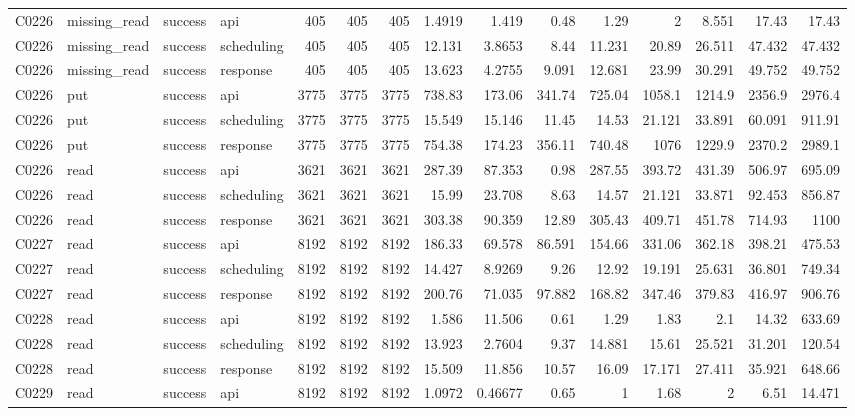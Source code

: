 \begin{landscape}
\begin{longtable}{llllrrrrrrrrrrr}
C0226 & missing\_\allowbreak{}read & success & api & 405 & 405 & 405 & 1.4919 & 1.419 & 0.48 & 1.29 & 2 & 8.551 & 17.43 & 17.43\\
C0226 & missing\_\allowbreak{}read & success & scheduling & 405 & 405 & 405 & 12.131 & 3.8653 & 8.44 & 11.231 & 20.89 & 26.511 & 47.432 & 47.432\\
C0226 & missing\_\allowbreak{}read & success & response & 405 & 405 & 405 & 13.623 & 4.2755 & 9.091 & 12.681 & 23.99 & 30.291 & 49.752 & 49.752\\
C0226 & put & success & api & 3775 & 3775 & 3775 & 738.83 & 173.06 & 341.74 & 725.04 & 1058.1 & 1214.9 & 2356.9 & 2976.4\\
C0226 & put & success & scheduling & 3775 & 3775 & 3775 & 15.549 & 15.146 & 11.45 & 14.53 & 21.121 & 33.891 & 60.091 & 911.91\\
C0226 & put & success & response & 3775 & 3775 & 3775 & 754.38 & 174.23 & 356.11 & 740.48 & 1076 & 1229.9 & 2370.2 & 2989.1\\
C0226 & read & success & api & 3621 & 3621 & 3621 & 287.39 & 87.353 & 0.98 & 287.55 & 393.72 & 431.39 & 506.97 & 695.09\\
C0226 & read & success & scheduling & 3621 & 3621 & 3621 & 15.99 & 23.708 & 8.63 & 14.57 & 21.121 & 33.871 & 92.453 & 856.87\\
C0226 & read & success & response & 3621 & 3621 & 3621 & 303.38 & 90.359 & 12.89 & 305.43 & 409.71 & 451.78 & 714.93 & 1100\\
C0227 & read & success & api & 8192 & 8192 & 8192 & 186.33 & 69.578 & 86.591 & 154.66 & 331.06 & 362.18 & 398.21 & 475.53\\
C0227 & read & success & scheduling & 8192 & 8192 & 8192 & 14.427 & 8.9269 & 9.26 & 12.92 & 19.191 & 25.631 & 36.801 & 749.34\\
C0227 & read & success & response & 8192 & 8192 & 8192 & 200.76 & 71.035 & 97.882 & 168.82 & 347.46 & 379.83 & 416.97 & 906.76\\
C0228 & read & success & api & 8192 & 8192 & 8192 & 1.586 & 11.506 & 0.61 & 1.29 & 1.83 & 2.1 & 14.32 & 633.69\\
C0228 & read & success & scheduling & 8192 & 8192 & 8192 & 13.923 & 2.7604 & 9.37 & 14.881 & 15.61 & 25.521 & 31.201 & 120.54\\
C0228 & read & success & response & 8192 & 8192 & 8192 & 15.509 & 11.856 & 10.57 & 16.09 & 17.171 & 27.411 & 35.921 & 648.66\\
C0229 & read & success & api & 8192 & 8192 & 8192 & 1.0972 & 0.46677 & 0.65 & 1 & 1.68 & 2 & 6.51 & 14.471\\

\end{longtable}
\end{landscape}
